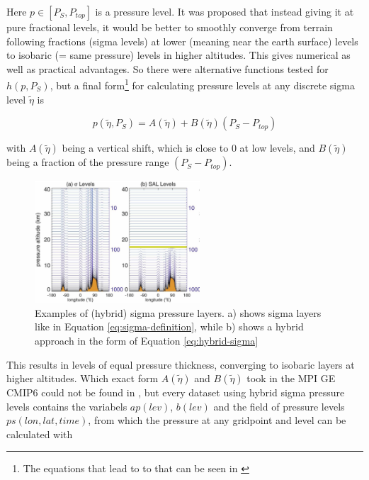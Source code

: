 Here $p \in [P_S, P_{top}]$ is a pressure level. 
It was proposed that instead giving it at pure fractional levels, it would be better to smoothly converge from terrain following fractions (sigma levels) at lower (meaning near the earth surface) levels to isobaric (= same pressure) levels in higher altitudes. 
This gives numerical as well as practical advantages.
So there were alternative functions tested for $h(p, P_S)$, but a final form\footnote{The equations that lead to to that can be seen in \cite{eckermann_hybrid_2009}} for calculating pressure levels at any discrete sigma level $\tilde{\eta}$ is

\begin{equation}
\label{eq:hybrid-sigma}
p(\tilde{\eta}, P_S) = A(\tilde{\eta}) + B(\tilde{\eta}) (P_S - P_{top})
\end{equation}


with $A(\tilde{\eta})$ being a vertical shift, which is close to 0 at low levels, and $B(\tilde{\eta})$ being a fraction of the pressure range $(P_S - P_{top})$. 

\begin{figure}
  \begin{center}
    \includegraphics[width=0.55\textwidth]{figures/hybrid_sigma_pressure_layers.png}
  \end{center}
  \caption{Examples of (hybrid) sigma pressure layers. a) shows sigma layers like in Equation \ref{eq:sigma-definition}, while b) shows a hybrid approach in the form of Equation \ref{eq:hybrid-sigma} \cite{eckermann_hybrid_2009}}\label{fig:hybrid-sigma}
\end{figure}



This results in levels of equal pressure thickness, converging to isobaric layers at higher altitudes. 
Which exact form $A(\tilde{\eta})$ and $B(\tilde{\eta})$ took in the MPI GE CMIP6 could not be found in \cite{olonscheck_new_2023}, but every dataset using hybrid sigma pressure levels contains the variabels $ap(lev)$, $b(lev)$ and the field of pressure levels $ps(lon, lat, time)$, from which the pressure at any gridpoint and level can be calculated with 

